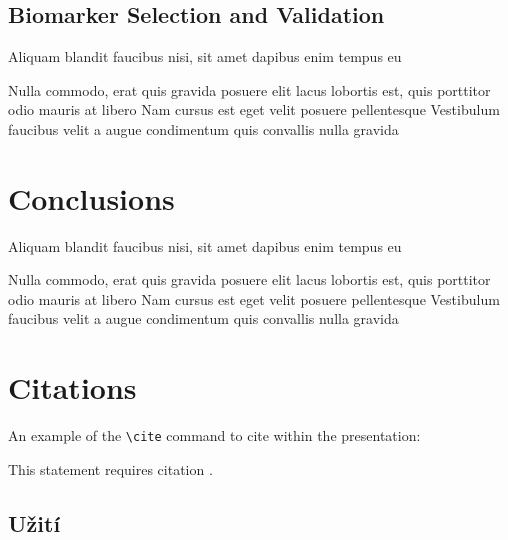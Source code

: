 \documentclass[
paper=landscape,
paper=160mm:90mm, %
fontsize=11pt, %
pagesize, %
parskip=half-, %
]{scrartcl} %
\theoremstyle{mythmstyle} %
\begin{document}
\clearpage

\subsection{Biomarker Selection and Validation}


\begin{outline}

\1 Aliquam blandit faucibus nisi, sit amet dapibus enim tempus eu

\2 Nulla commodo, erat quis gravida posuere
\1 elit lacus lobortis est, quis porttitor odio mauris at libero
\1 Nam cursus est eget velit posuere pellentesque
\1 Vestibulum faucibus velit a augue condimentum quis convallis nulla gravida

\end{outline}


\clearpage


\section*{Conclusions} %


\begin{outline}

\1 Aliquam blandit faucibus nisi, sit amet dapibus enim tempus eu

\2 Nulla commodo, erat quis gravida posuere
\1 elit lacus lobortis est, quis porttitor odio mauris at libero
\1 Nam cursus est eget velit posuere pellentesque
\1 Vestibulum faucibus velit a augue condimentum quis convallis nulla gravida

\end{outline}


\clearpage


\section*{Citations}

An example of the \texttt{\textbackslash cite} command to cite within the presentation:

This statement requires citation \cite{Smith:2012qr}.

\clearpage

\subsection*{Užití}
\end{document}
